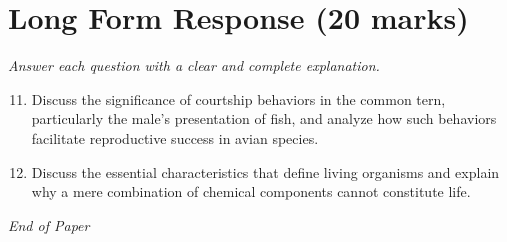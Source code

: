\documentclass[12pt]{article}
\begin{document}
\section*{Long Form Response (20 marks)}
\textit{Answer each question with a clear and complete explanation.}
\begin{enumerate}[label=\arabic*.]
\setcounter{enumi}{10}
\item Discuss the significance of courtship behaviors in the common tern, particularly the male's presentation of fish, and analyze how such behaviors facilitate reproductive success in avian species.
\item Discuss the essential characteristics that define living organisms and explain why a mere combination of chemical components cannot constitute life.
\end{enumerate}

\vfill
\noindent\textit{End of Paper}
\end{document}
